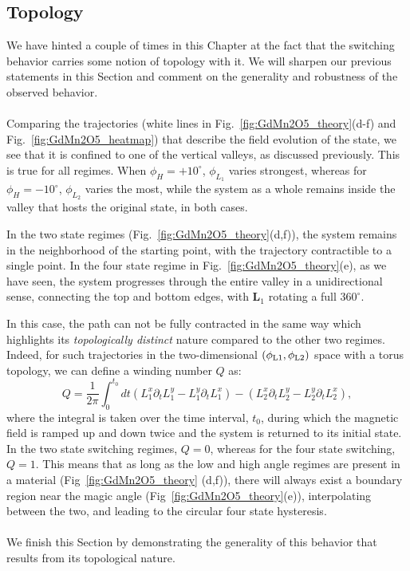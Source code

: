 \subsection{Topology \label{sec:GdMn2O5_topology}}
We have hinted a couple of times in this Chapter at the fact that the switching behavior carries some notion of topology with it.
We will sharpen our previous statements in this Section and comment on the generality and robustness of the observed behavior.
\\\\
Comparing the trajectories (white lines in Fig.~\ref{fig:GdMn2O5_theory}(d-f) and Fig.~\ref{fig:GdMn2O5_heatmap}) that describe the field evolution of the state, we see that it is confined to one of the vertical valleys, as discussed previously.
This is true for all regimes. When $\phi_H = +10^\circ$, $\phi_{L_1}$ varies strongest, whereas for $\phi_H = -10^\circ$, $\phi_{L_2}$ varies the most, while the system as a whole remains inside the valley that hosts the original state, in both cases.

In the two state regimes (Fig.~\ref{fig:GdMn2O5_theory}(d,f)), the system remains in the neighborhood of the starting point, with the trajectory contractible to a single point. 
In the four state regime in Fig.~\ref{fig:GdMn2O5_theory}(e), as we have seen, the system progresses through the entire valley in a unidirectional sense, connecting the top and bottom edges, with $\bm{L}_1$ rotating a full $360^\circ$.

In this case, the path can not be fully contracted in the same way which highlights its {\em  topologically distinct} nature compared to the other two regimes.
Indeed, for such trajectories in the two-dimensional $(\phi_{\rm L1},\phi_{\rm L2})$ space with a torus topology, we can define a winding number $Q$ as:
\begin{equation}
Q=\frac{1}{2\pi}\int_0^{t_0} dt (L_1^x\partial_t L_1^y - L_1^y \partial_t L_1^x) - (L_2^x\partial_t L_2^y - L_2^y \partial_t L_2^x),
\end{equation}
where the integral is taken over the time interval, $t_0$, during which the magnetic field is ramped up and down twice and the system is returned to its initial state.
In the two state switching regimes, $Q  = 0$, whereas for the four state switching, $Q = 1$.
This means that as long as the low and high angle regimes are present in a material (Fig~\ref{fig:GdMn2O5_theory} (d,f)), there will always exist a boundary region near the magic angle (Fig~\ref{fig:GdMn2O5_theory}(e)), interpolating between the two, and leading to the circular four state hysteresis.
\\\\
We finish this Section by demonstrating the generality of this behavior that results from its topological nature.


